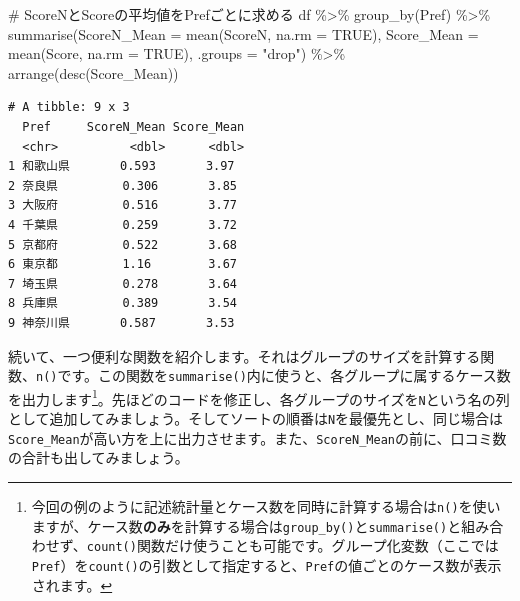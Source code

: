 \documentclass[
  a4paper,
  pandoc,
  ja=standard,
  jafont=haranoaji]{bxjsbook}
\newenvironment{Shaded}{\begin{snugshade}}{\end{snugshade}}
\newcommand{\AttributeTok}[1]{\textcolor[rgb]{0.00,0.48,0.65}{#1}}
\newcommand{\CommentTok}[1]{\textcolor[rgb]{0.37,0.37,0.37}{#1}}
\newcommand{\ConstantTok}[1]{\textcolor[rgb]{0.56,0.35,0.01}{#1}}
\newcommand{\FunctionTok}[1]{\textcolor[rgb]{0.28,0.35,0.67}{#1}}
\newcommand{\NormalTok}[1]{\textcolor[rgb]{0.00,0.48,0.65}{#1}}
\newcommand{\SpecialCharTok}[1]{\textcolor[rgb]{0.37,0.37,0.37}{#1}}
\newcommand{\StringTok}[1]{\textcolor[rgb]{0.13,0.47,0.30}{#1}}
\begin{document}
\begin{Shaded}
\begin{Highlighting}[numbers=left,,]
\CommentTok{\# ScoreNとScoreの平均値をPrefごとに求める}
\NormalTok{df }\SpecialCharTok{\%\textgreater{}\%}
  \FunctionTok{group\_by}\NormalTok{(Pref) }\SpecialCharTok{\%\textgreater{}\%}
  \FunctionTok{summarise}\NormalTok{(}\AttributeTok{ScoreN\_Mean =} \FunctionTok{mean}\NormalTok{(ScoreN, }\AttributeTok{na.rm =} \ConstantTok{TRUE}\NormalTok{),}
            \AttributeTok{Score\_Mean  =} \FunctionTok{mean}\NormalTok{(Score,  }\AttributeTok{na.rm =} \ConstantTok{TRUE}\NormalTok{),}
            \AttributeTok{.groups     =} \StringTok{"drop"}\NormalTok{) }\SpecialCharTok{\%\textgreater{}\%}
  \FunctionTok{arrange}\NormalTok{(}\FunctionTok{desc}\NormalTok{(Score\_Mean))}
\end{Highlighting}
\end{Shaded}

\begin{verbatim}
# A tibble: 9 x 3
  Pref     ScoreN_Mean Score_Mean
  <chr>          <dbl>      <dbl>
1 和歌山県       0.593       3.97
2 奈良県         0.306       3.85
3 大阪府         0.516       3.77
4 千葉県         0.259       3.72
5 京都府         0.522       3.68
6 東京都         1.16        3.67
7 埼玉県         0.278       3.64
8 兵庫県         0.389       3.54
9 神奈川県       0.587       3.53
\end{verbatim}

続いて、一つ便利な関数を紹介します。それはグループのサイズを計算する関数、\texttt{n()}です。この関数を\texttt{summarise()}内に使うと、各グループに属するケース数を出力します\footnote{今回の例のように記述統計量とケース数を同時に計算する場合は\texttt{n()}を使いますが、ケース数\textbf{のみ}を計算する場合は\texttt{group\_by()}と\texttt{summarise()}と組み合わせず、\texttt{count()}関数だけ使うことも可能です。グループ化変数（ここでは\texttt{Pref}）を\texttt{count()}の引数として指定すると、\texttt{Pref}の値ごとのケース数が表示されます。}。先ほどのコードを修正し、各グループのサイズを\texttt{N}という名の列として追加してみましょう。そしてソートの順番は\texttt{N}を最優先とし、同じ場合は\texttt{Score\_Mean}が高い方を上に出力させます。また、\texttt{ScoreN\_Mean}の前に、口コミ数の合計も出してみましょう。
\end{document}
